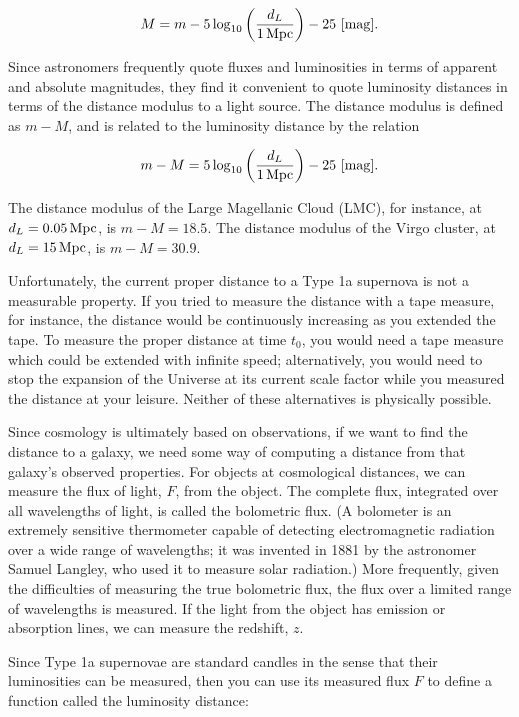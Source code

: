 \documentclass[a4paper,11pt]{article}
\begin{document}
\begin{align*}
    M = m -5\log_{10}\left(\frac{d_L}{1\,{\rm Mpc}}\right)-25 ~ [{\rm mag}].
\end{align*}

{\noindent}Since astronomers frequently quote fluxes and luminosities in terms of apparent and absolute magnitudes, they find it convenient to quote luminosity distances in terms of the distance modulus to a light source. The distance modulus is defined as $m-M$, and is related to the luminosity distance by the relation

\begin{align*}
    m - M = 5\log_{10}\left(\frac{d_L}{1\,{\rm Mpc}}\right)-25 ~ [{\rm mag}].
\end{align*}

{\noindent}The distance modulus of the Large Magellanic Cloud (LMC), for instance, at $d_L = 0.05\,{\rm Mpc}$, is $m - M = 18.5$. The distance modulus of the Virgo cluster, at $d_L = 15\,{\rm Mpc}$, is $m - M = 30.9$. 

{\noindent}Unfortunately, the current proper distance to a Type 1a supernova is not a measurable property. If you tried to measure the distance with a tape measure, for instance, the distance would be continuously increasing as you extended the tape. To measure the proper distance at time $t_0$, you would need a tape measure which could be extended with infinite speed; alternatively, you would need to stop the expansion of the Universe at its current scale factor while you measured the distance at your leisure. Neither of these alternatives is physically possible.

{\noindent}Since cosmology is ultimately based on observations, if we want to find the distance to a galaxy, we need some way of computing a distance from that galaxy’s observed properties. For objects at cosmological distances, we can measure the flux of light, $F$, from the object. The complete flux, integrated over all wavelengths of light, is called the bolometric flux. (A bolometer is an extremely sensitive thermometer capable of detecting electromagnetic radiation over a wide range of wavelengths; it was invented in 1881 by the astronomer Samuel Langley, who used it to measure solar radiation.) More frequently, given the difficulties of measuring the true bolometric flux, the flux over a limited range of wavelengths is measured. If the light from the object has emission or absorption lines, we can measure the redshift, $z$.

{\noindent}Since Type 1a supernovae are standard candles in the sense that their luminosities can be measured, then you can use its measured flux $F$ to define a function called the luminosity distance:
\end{document}
